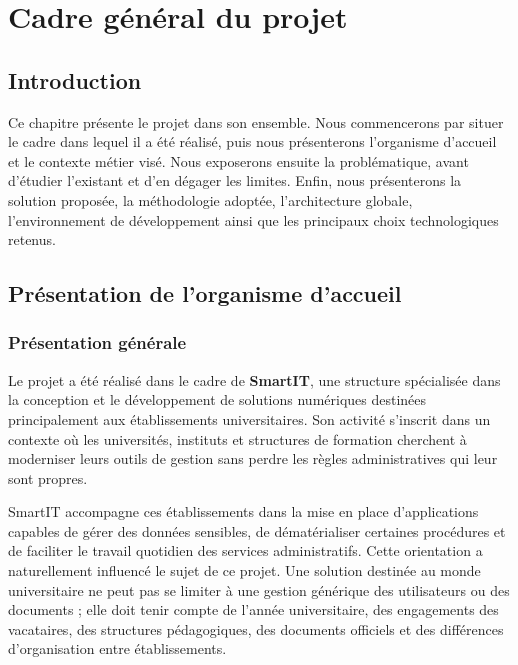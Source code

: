 
\chapter{Cadre général du projet}

\section{Introduction}

Ce chapitre présente le projet dans son ensemble. Nous commencerons par situer le cadre dans lequel il a été réalisé, puis nous présenterons l'organisme d'accueil et le contexte métier visé. Nous exposerons ensuite la problématique, avant d'étudier l'existant et d'en dégager les limites. Enfin, nous présenterons la solution proposée, la méthodologie adoptée, l'architecture globale, l'environnement de développement ainsi que les principaux choix technologiques retenus.

\section{Présentation de l'organisme d'accueil}

\subsection{Présentation générale}

Le projet a été réalisé dans le cadre de \textbf{SmartIT}, une structure spécialisée dans la conception et le développement de solutions numériques destinées principalement aux établissements universitaires. Son activité s'inscrit dans un contexte où les universités, instituts et structures de formation cherchent à moderniser leurs outils de gestion sans perdre les règles administratives qui leur sont propres.

SmartIT accompagne ces établissements dans la mise en place d'applications capables de gérer des données sensibles, de dématérialiser certaines procédures et de faciliter le travail quotidien des services administratifs. Cette orientation a naturellement influencé le sujet de ce projet. Une solution destinée au monde universitaire ne peut pas se limiter à une gestion générique des utilisateurs ou des documents ; elle doit tenir compte de l'année universitaire, des engagements des vacataires, des structures pédagogiques, des documents officiels et des différences d'organisation entre établissements.

